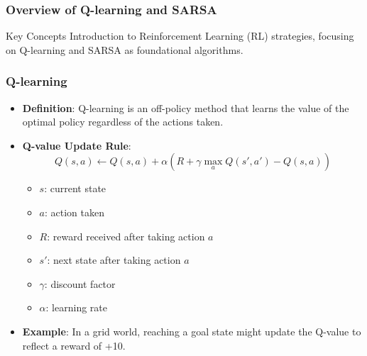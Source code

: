 \documentclass[aspectratio=169]{beamer}
\begin{document}
\begin{frame}[fragile]
    \frametitle{Overview of Q-learning and SARSA}
    \begin{block}{Key Concepts}
        Introduction to Reinforcement Learning (RL) strategies, focusing on Q-learning and SARSA as foundational algorithms. 
    \end{block}
\end{frame}

\begin{frame}[fragile]
    \frametitle{Q-learning}
    \begin{itemize}
        \item \textbf{Definition}: 
        Q-learning is an off-policy method that learns the value of the optimal policy regardless of the actions taken.
        \item \textbf{Q-value Update Rule}:
        \begin{equation}
        Q(s, a) \leftarrow Q(s, a) + \alpha \left( R + \gamma \max_a Q(s', a') - Q(s, a) \right)
        \end{equation}
        \begin{itemize}
            \item \( s \): current state
            \item \( a \): action taken
            \item \( R \): reward received after taking action \( a \)
            \item \( s' \): next state after taking action \( a \)
            \item \( \gamma \): discount factor
            \item \( \alpha \): learning rate
        \end{itemize}
        \item \textbf{Example}:
        In a grid world, reaching a goal state might update the Q-value to reflect a reward of +10.
    \end{itemize}
\end{frame}
\end{document}
